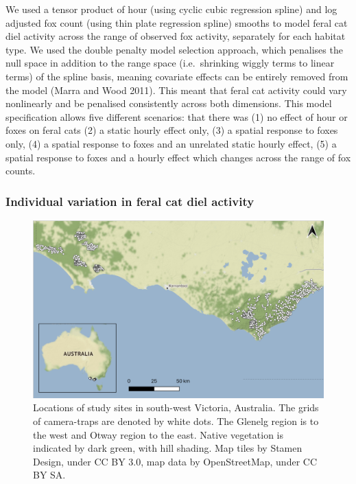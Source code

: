 \documentclass[]{elsarticle} %
\begin{document}
We used a tensor product of hour (using cyclic cubic regression spline) and log adjusted fox count (using thin plate regression spline) smooths to model feral cat diel activity across the range of observed fox activity, separately for each habitat type. We used the double penalty model selection approach, which penalises the null space in addition to the range space (i.e.~shrinking wiggly terms to linear terms) of the spline basis, meaning covariate effects can be entirely removed from the model (Marra and Wood 2011). This meant that feral cat activity could vary nonlinearly and be penalised consistently across both dimensions. This model specification allows five different scenarios: that there was (1) no effect of hour or foxes on feral cats (2) a static hourly effect only, (3) a spatial response to foxes only, (4) a spatial response to foxes and an unrelated static hourly effect, (5) a spatial response to foxes and a hourly effect which changes across the range of fox counts.

\hypertarget{individual-variation-in-feral-cat-diel-activity}{%
\subsubsection{Individual variation in feral cat diel activity}\label{individual-variation-in-feral-cat-diel-activity}}

\newpage

\begin{figure}
\includegraphics[width=1\linewidth]{../figs/fig1_map} \caption{Locations of study sites in south-west Victoria, Australia. The grids of camera-traps are denoted by white dots. The Glenelg region is to the west and Otway region to the east. Native vegetation is indicated by dark green, with hill shading. Map tiles by Stamen Design, under CC BY 3.0, map data by OpenStreetMap, under CC BY SA.}\label{fig:map}
\end{figure}
\end{document}
